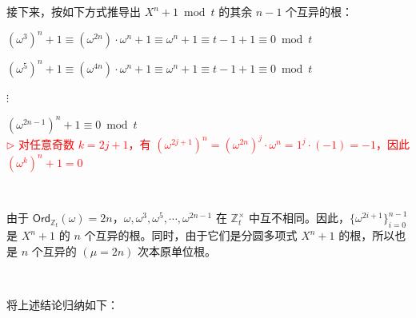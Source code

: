接下来，按如下方式推导出 $X^n + 1 \bmod t$ 的其余 $n-1$ 个互异的根：

$(\omega^3)^n + 1 \equiv (\omega^{2n})\cdot \omega^n + 1 \equiv \omega^n + 1 \equiv t - 1 + 1 \equiv 0 \bmod t$

$(\omega^5)^n + 1 \equiv (\omega^{4n})\cdot \omega^n + 1 \equiv \omega^n + 1 \equiv t - 1 + 1 \equiv 0 \bmod t$

$\vdots$

$(\omega^{2n - 1})^n + 1 \equiv 0 \bmod t$ \\ \textcolor{red}{ $\rhd$ 对任意奇数 $k = 2j+1$，有 $(\omega^{2j+1})^n = (\omega^{2n})^j \cdot \omega^n = 1^j \cdot (-1) = -1$，因此 $(\omega^k)^n + 1 = 0$}

$ $

由于 $\textsf{Ord}_{\mathbb{Z}_t}(\omega) = 2n$，$\omega, \omega^3, \omega^5, \cdots, \omega^{2n - 1}$ 在 $\mathbb{Z}_t^{\times}$ 中互不相同。因此，$\{\omega^{2i + 1}\}_{i=0}^{n-1}$ 是 $X^n + 1$ 的 $n$ 个互异的根。同时，由于它们是分圆多项式 $X^n + 1$ 的根，所以也是 $n$ 个互异的 $(\mu=2n)$ 次本原单位根。


$ $


将上述结论归纳如下：

